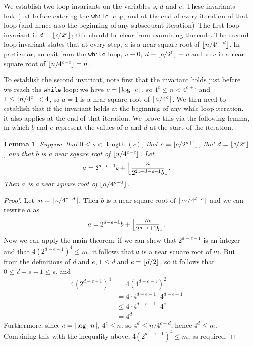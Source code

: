 \documentclass[a4paper]{article}
\DeclarePairedDelimiter\floor{\lfloor}{\rfloor}
\DeclareMathOperator{\length}{length}
\theoremstyle{plain}
\newtheorem{lemma}[theorem]{Lemma}
\theoremstyle{definition}
\begin{document}
We establish two loop invariants on the variables $s$, $d$ and $e$. These
invariants hold just before entering the \lstinline$while$ loop, and at the end
of every iteration of that loop (and hence also the beginning of any subsequent
iteration). The first loop invariant is $d = \floor{c/2^s}$; this should be
clear from examining the code. The second loop invariant states that at every
step, $a$ is a near square root of $\floor{n / 4^{c-d}}$. In particular, on exit
from the \lstinline$while$ loop, $s = 0$, $d = \floor{c/2^0} = c$ and so $a$ is
a near square root of $\floor{n / 4^{c-c}} = n$.

To establish the second invariant, note first that the invariant holds just
before we reach the \lstinline$while$ loop: we have $c = \floor{\log_4 n}$, so
$4^c \le n < 4^{c+1}$ and $1 \le \floor{n / 4^c} < 4$, so $a = 1$ is a near
square root of $\floor{n / 4^c}$. We then need to establish that if the
invariant holds at the beginning of any while loop iteration, it also applies
at the end of that iteration. We prove this via the following lemma, in which
$b$ and $e$ represent the values of $a$ and $d$ at the start of the iteration.

\begin{lemma}
  Suppose that $0 \le s < \length(c)$, that $e = \floor{c / 2^{s + 1}}$, that $d =
  \floor{c / 2^s}$, and that $b$ is a near square root of $\floor{n /
  4^{c-e}}$. Let
  $$a = 2^{d-e-1}b + \floor*{\frac{n}{2^{2c-d-e+1}b}}.$$ Then $a$ is a near
  square root of $\floor{n / 4^{c-d}}$.
\end{lemma}

\begin{proof}
  Let $m = \floor{n / 4^{c-d}}$. Then $b$ is a near square root of
  $\floor{m/4^{d-e}}$ and we can rewrite $a$ as
  $$a = 2^{d-e-1}b + \floor*{\frac{m}{2^{d-e+1}b}}.$$ Now we can apply the main
  theorem: if we can show that $2^{d-e-1}$ is an integer and that
  $4(2^{d-e-1})^4 \le m$, it follows that $a$ is a near square root of $m$. But
  from the definitions of $d$ and $e$, $1 \le d$ and $e
  = \floor{d/2}$, so it follows that $0 \le d - e - 1 \le e$, and
  \begin{align*}
    4(2^{d-e-1})^4 &= 4(4^{d-e-1})^2 \\
                  &= 4\cdot 4^{d-e-1}\cdot 4^{d-e-1} \\
                  &\le 4\cdot 4^{d-e-1}\cdot 4^e \\
                  &= 4^d
  \end{align*}
  Furthermore, since $c = \floor{\log_4 n}$, $4^c \le n$, so $4^d \le n /
  4^{c-d}$, hence $4^d \le m$. Combining this with the inequality above,
  $4(2^{d-e-1})^4 \le m$, as required.
\end{proof}
\end{document}
